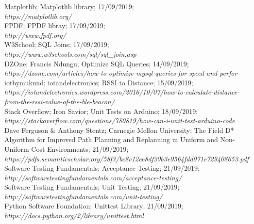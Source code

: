 \documentclass{report}
\begin{document}
\begin{thebibliography}{9}
        Matplotlib; Matplotlib library; 17/09/2019;\\
        \textit{https://matplotlib.org/}\\ 
        
        FPDF; FPDF libray; 17/09/2019; \\
        \textit{http://www.fpdf.org/} \\
        
        W3School; SQL Joins; 17/09/2019; \\
        \textit{https://www.w3schools.com/sql/sql\_join.asp} \\
        
        DZOne;  Francis Ndungu; Optimize SQL Queries; 14/09/2019; \\ 
        \textit{https://dzone.com/articles/how-to-optimize-mysql-queries-for-speed-and-perfor}\\
        
         iotbymukund; iotandelectronics; RSSI to Distance; 15/09/2019;\\ 
         \textit{https://iotandelectronics.wordpress.com/2016/10/07/how-to-calculate-distance-from-the-rssi-value-of-the-ble-beacon/} \\
         
         Stack Overflow; Iron Savior; Unit Tests on Arduino; 18/09/2019;\\
         \textit{https://stackoverflow.com/questions/780819/how-can-i-unit-test-arduino-code} \\
         
         Dave Ferguson & Anthony Stentz; Carnegie Mellon University; The Field D* Algorithm for Improved Path Planning and Replanning in Uniform and Non-Uniform Cost Environments; 21/09/2019; \\
         \textit{https://pdfs.semanticscholar.org/58f3/bc8c12ee8df30b3e9564fdd071e729408653.pdf}\\
         
         Software Testing Fundamentals; Acceptance Testing; 21/09/2019; \\
         \textit{http://softwaretestingfundamentals.com/acceptance-testing/}\\
         
         
         Software Testing Fundamentals; Unit Testing; 21/09/2019; \\
         \textit{http://softwaretestingfundamentals.com/unit-testing/}\\
         
         Python Software Foundation; Unittest Library; 21/09/2019; \\
         \textit{https://docs.python.org/2/library/unittest.html} \\
         
\end{thebibliography}
\end{document}

